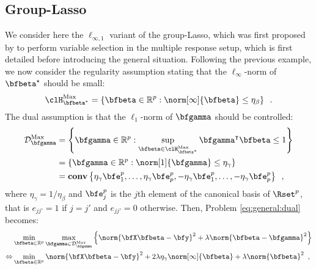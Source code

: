 \subsection{Group-Lasso}

We consider here the $\ell_{\infty,1}$ variant of the group-Lasso, which was
first proposed by \citet{Turlach05} to perform variable selection in the
multiple response setup, which is first detailed before introducing the general
situation.
Following the previous example, we now consider the regularity assumption stating
that the $\ell_\infty$-norm of $\bfbeta^\star$ should be small:
%
\begin{equation*}
  \clH^\mathrm{Max}_{\bfbeta^*} = \left\{ \bfbeta \in \mathbb{R}^p : \norm[\infty]{\bfbeta} \leq \eta_\beta \right\}
  \enspace.
\end{equation*}
%
The dual assumption is that the $\ell_1$-norm of $\bfgamma$ should be
controlled:
%
\begin{align*}
  \mathcal{D}^\mathrm{Max}_{\bfgamma} & = \left\{ \bfgamma \in \mathbb{R}^p :
\sup_{\bfbeta\in\clH^\mathrm{Max}_{\bfbeta^*}} \bfgamma^\intercal\bfbeta \leq 1 \right\} \\
    & = \left\{ \bfgamma \in \mathbb{R}^p : \norm[1]{\bfgamma} \leq \eta_\gamma \right\} \\
    & = \mathbf{conv} \left\{\eta_\gamma\bfe^p_1, \ldots, \eta_\gamma\bfe^p_p,-\eta_\gamma\bfe^p_1, \ldots, -\eta_\gamma\bfe^p_p \right\}
  \enspace,
\end{align*}
where $\eta_\gamma=1/\eta_\beta$ and $\bfe^p_j$ is the $j$th element of the
canonical basis of $\Rset^p$, that is $e_{jj'} = 1$ if $j=j'$ and $e_{jj'} = 0$
otherwise.
Then, Problem \eqref{eq:general:dual} becomes:
%
\begin{align*}
  & \min_{\bfbeta\in\mathbb{R}^p} \max_{\bfgamma \in \mathcal{D}^\mathrm{Max}_{\bfgamma}}
      \Big\{ \norm{\bfX \bfbeta - \bfy}^2 + \lambda \norm{\bfbeta - \bfgamma}^2 \Big\} \\
  \Leftrightarrow
    & \min_{\bfbeta\in\mathbb{R}^p}
      \norm{\bfX \bfbeta - \bfy}^2 + 2 \lambda \eta_\gamma \norm[\infty]{\bfbeta} + \lambda \norm{\bfbeta}^2 
  \enspace,
\end{align*}
%


